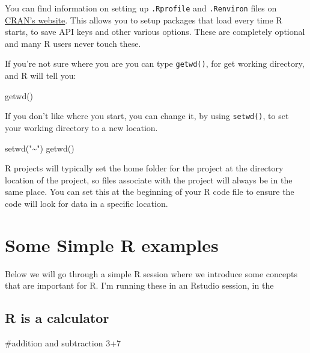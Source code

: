\documentclass[
  letterpaper,
  DIV=11,
  numbers=noendperiod]{scrreprt}
\newenvironment{Shaded}{\begin{snugshade}}{\end{snugshade}}
\newcommand{\CommentTok}[1]{\textcolor[rgb]{0.37,0.37,0.37}{#1}}
\newcommand{\DecValTok}[1]{\textcolor[rgb]{0.68,0.00,0.00}{#1}}
\newcommand{\FunctionTok}[1]{\textcolor[rgb]{0.28,0.35,0.67}{#1}}
\newcommand{\NormalTok}[1]{\textcolor[rgb]{0.00,0.23,0.31}{#1}}
\newcommand{\SpecialCharTok}[1]{\textcolor[rgb]{0.37,0.37,0.37}{#1}}
\newcommand{\StringTok}[1]{\textcolor[rgb]{0.13,0.47,0.30}{#1}}
\begin{document}
You can find information on setting up \texttt{.Rprofile} and
\texttt{.Renviron} files on
\href{https://cran.r-project.org/web/packages/startup/vignettes/startup-intro.html}{CRAN's
website}. This allows you to setup packages that load every time R
starts, to save API keys and other various options. These are completely
optional and many R users never touch these.

If you're not sure where you are you can type \texttt{getwd()}, for get
working directory, and R will tell you:

\begin{Shaded}
\begin{Highlighting}[]
\FunctionTok{getwd}\NormalTok{()}
\end{Highlighting}
\end{Shaded}

If you don't like where you start, you can change it, by using
\texttt{setwd()}, to set your working directory to a new location.

\begin{Shaded}
\begin{Highlighting}[]
\FunctionTok{setwd}\NormalTok{(}\StringTok{"\textasciitilde{}"}\NormalTok{)}
\FunctionTok{getwd}\NormalTok{()}
\end{Highlighting}
\end{Shaded}

R projects will typically set the home folder for the project at the
directory location of the project, so files associate with the project
will always be in the same place. You can set this at the beginning of
your R code file to ensure the code will look for data in a specific
location.

\hypertarget{some-simple-r-examples}{%
\section{Some Simple R examples}\label{some-simple-r-examples}}

Below we will go through a simple R session where we introduce some
concepts that are important for R. I'm running these in an Rstudio
session, in the

\hypertarget{r-is-a-calculator}{%
\subsection{R is a calculator}\label{r-is-a-calculator}}

\begin{Shaded}
\begin{Highlighting}[]
\CommentTok{\#addition and subtraction}
\DecValTok{3}\SpecialCharTok{+}\DecValTok{7}
\end{Highlighting}
\end{Shaded}
\end{document}
